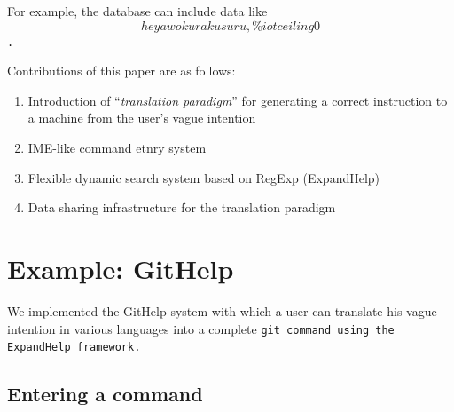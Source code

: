 \documentclass{sigchi}
\def\GH{\textsf{GitHelp}}
\def\EH{\textsf{ExpandHelp}}
\begin{document}
For example, the database can include data like
\tt{\[ heya wo kuraku suru, \% iot ceiling 0 \]}.


Contributions of this paper are as follows:

\begin{enumerate}
\item Introduction of ``\textit{translation paradigm}'' for
  generating a correct instruction to a machine from
  the user's vague intention
\item IME-like command etnry system
\item Flexible dynamic search system based on RegExp (ExpandHelp)
\item Data sharing infrastructure for the translation paradigm
\end{enumerate}

\section{Example: GitHelp}

We implemented the {\GH} system
with which a user can translate his vague intention in various languages
into a complete \tt{git} command
using the {\EH} framework.

\subsection{Entering a command}
\end{document}
